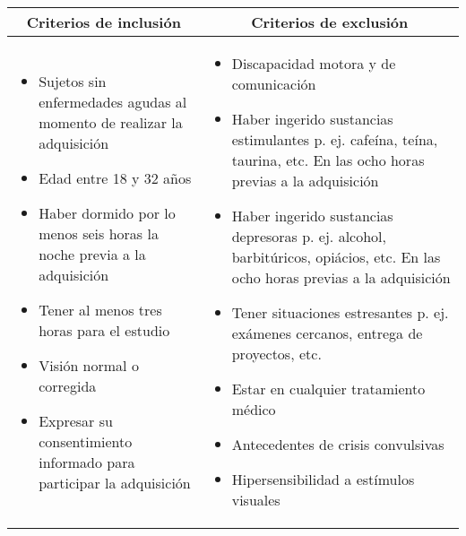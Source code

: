 	\begin{tabular}{p{}|p{}}
	    \hline
		\multicolumn{1}{c}{\bf Criterios de inclusión }
		  & \multicolumn{1}{c}{\bf Criterios de exclusión }\\
		\hline
		\begin{itemize}
			\item Sujetos sin enfermedades agudas al momento de realizar la adquisición
			\item Edad entre 18 y 32 años
			\item Haber dormido por lo menos seis horas la noche previa a la adquisición
			\item Tener al menos tres horas para el estudio
			\item Visión normal o corregida
			\item Expresar su consentimiento informado para participar la adquisición
		\end{itemize}&
		\begin{itemize}
			\item Discapacidad motora y de comunicación
			\item Haber ingerido sustancias estimulantes p. ej. cafeína, teína, taurina, etc. En las ocho horas previas a la adquisición
			\item Haber ingerido sustancias depresoras p. ej. alcohol, barbitúricos, opiácios, etc. En las ocho horas previas a la adquisición
			\item Tener situaciones estresantes p. ej. exámenes cercanos, entrega de proyectos, etc.
			\item Estar en cualquier tratamiento médico
			\item Antecedentes de crisis convulsivas
			\item Hipersensibilidad a estímulos visuales
		\end{itemize}\\
	\hline
	\end{tabular}
